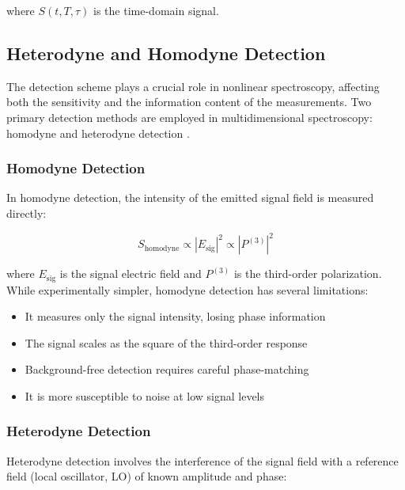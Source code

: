 \noindent where $S(t, T, \tau)$ is the time-domain signal.

\subsection{Heterodyne and Homodyne Detection}
\label{subsec:heterodyne_homodyne}

\noindent The detection scheme plays a crucial role in nonlinear spectroscopy, affecting both the sensitivity and the information content of the measurements. Two primary detection methods are employed in multidimensional spectroscopy: homodyne and heterodyne detection \cite{Lepetit1995, Tian2003}.

\subsubsection{Homodyne Detection}
\label{subsubsec:homodyne}

\noindent In homodyne detection, the intensity of the emitted signal field is measured directly:

\begin{equation}
    S_{\text{homodyne}} \propto |E_{\text{sig}}|^2 \propto |P^{(3)}|^2
    \label{eq:homodyne}
\end{equation}

\noindent where $E_{\text{sig}}$ is the signal electric field and $P^{(3)}$ is the third-order polarization. While experimentally simpler, homodyne detection has several limitations:

\begin{itemize}
    \item It measures only the signal intensity, losing phase information
    \item The signal scales as the square of the third-order response
    \item Background-free detection requires careful phase-matching
    \item It is more susceptible to noise at low signal levels
\end{itemize}

\subsubsection{Heterodyne Detection}
\label{subsubsec:heterodyne}

\noindent Heterodyne detection involves the interference of the signal field with a reference field (local oscillator, LO) of known amplitude and phase:

